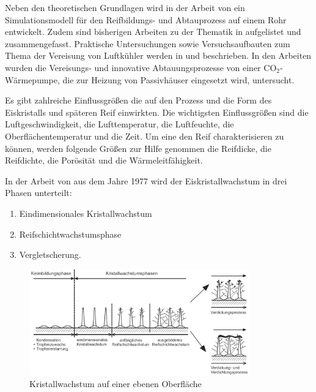 Neben den theoretischen Grundlagen wird in der Arbeit von \textsc{\citeauthor{Schydlo2010}} ein Simulationsmodell für den Reifbildungs- und Abtauprozess auf einem Rohr entwickelt. Zudem sind bisherigen Arbeiten zu der Thematik in \citep{Schydlo2010} aufgelistet und zusammengefasst. 
Praktische Untersuchungen sowie Versuchsaufbauten zum Thema der Vereisung von Luftkühler werden in \textsc{\citeauthor{Sahinagic2004}} und \textsc{\citeauthor{Kosowski2009}} beschrieben. In den Arbeiten wurden die Vereisungs- und innovative Abtauungsprozesse von einer CO$_2$-Wärmepumpe, die zur Heizung von Passivhäuser eingesetzt wird, untersucht.   



Es gibt zahlreiche Einflussgrößen die auf den Prozess und die Form des Eiskristalls und späteren Reif einwirkten. 
  Die wichtigsten Einflussgrößen sind die Luftgeschwindigkeit, die Lufttemperatur, die Luftfeuchte, die Oberflächentemperatur und die Zeit. Um eine den Reif charakterisieren zu können, werden folgende Größen zur Hilfe genommen die Reifdicke, die Reifdichte, die Porösität und die Wärmeleitfähigkeit. 

In der Arbeit von \textsc{\citeauthor{Hayashi1977}} aus dem Jahre 1977 wird der Eiskristallwachstum in drei Phasen unterteilt:

\begin{enumerate}
\item Eindimensionales Kristallwachstum
\item Reifschichtwachstumsphase 
\item Vergletscherung.
\end{enumerate}


\begin{figure}[htb]
\centering		\includegraphics[width=0.85\textwidth]{Pictures/Reifbildungsphasen_Schydlo.png}
\caption{Kristallwachstum auf einer ebenen Oberfläche \citep{Schydlo2010}}
\label{fig:Kristallwachstum}
\end{figure}


